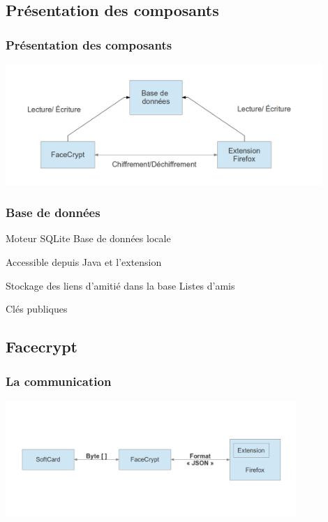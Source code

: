 \documentclass{beamer}
\begin{document}
\subsection{Présentation des composants}
\begin{frame}
    \frametitle{Présentation des composants}
    \includegraphics[width=12cm]{schema_zako}
\end{frame}


\begin{frame}
    \frametitle{Base de données}
    \begin{block}{Moteur SQLite }
        Base de données locale

        Accessible depuis Java et l'extension 
    \end{block}
    \begin{block}{Stockage des liens d'amitié dans la base}
        Listes d'amis


        Clés publiques


    \end{block}
\end{frame}


\subsection{Facecrypt}
\begin{frame}
    \frametitle{La communication}
    \includegraphics[width=11cm]{schema_dolby}
\end{frame}
\end{document}
